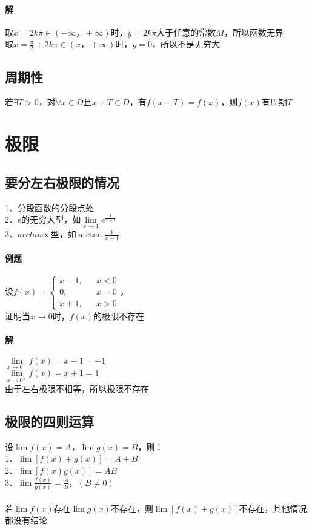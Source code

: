 \documentclass{article}
\begin{document}
\begin{flushleft}
	\paragraph{解}
	取$x=2k\pi\in(-\infty，+\infty)$时，$y=2k\pi$大于任意的常数$M$，所以函数无界\\
	取$x=\frac{\pi}{2}+2k\pi\in(x，+\infty)$时，$y=0$，所以不是无穷大\\
	
	\subsection{周期性}
	若$\exists T>0$，对$\forall x\in D$且$x+T\in D$，有$f(x+T)=f(x)$，则$f(x)$有周期$T$\\
	
	
	\section{极限}
	
	\subsection{要分左右极限的情况}
	1、分段函数的分段点处\\
	2、e的无穷大型，如$\lim\limits_{x\to 1} e^{\frac{1}{x-1}}$\\
	3、$arctan\infty$型，如$\arctan{\frac{1}{x-1}}$\\
	
	\paragraph{例题}
	设$f(x)=\left\{
	\begin{array}{rcl}
		x-1,& & x<0\\
		0,& & x=0\\
		x+1,& & x>0
	\end{array} \right.$，\\
	证明当$x\to 0$时，$f(x)$的极限不存在
	\paragraph{解}
	$\lim\limits_{x\to 0^-}f(x)=x-1=-1$\\
	$\lim\limits_{x\to 0^+}f(x)=x+1=1$\\
	由于左右极限不相等，所以极限不存在\\
	
	\subsection{极限的四则运算}
	设$\lim f(x)=A，\lim g(x)=B$，则：\\
	1、$\lim [f(x)\pm g(x)]=A\pm B$\\
	2、$\lim [f(x)g(x)]=AB$\\
	3、$\lim \frac{f(x)}{g(x)} =\frac{A}{B}，(B\neq 0)$\\
	~\\
	若$\lim f(x)$存在$\lim g(x)$不存在，则$\lim [f(x)\pm g(x)]$不存在，其他情况都没有结论\\
	~\\

\end{flushleft}
\end{document}
